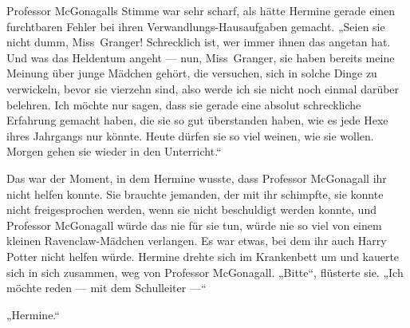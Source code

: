 Professor McGonagalls Stimme war sehr scharf, als hätte Hermine gerade einen furchtbaren Fehler bei ihren Verwandlungs-Hausaufgaben gemacht.
„Seien sie nicht dumm, Miss~Granger! Schrecklich ist, wer immer ihnen das angetan hat. Und was das Heldentum angeht — nun, Miss~Granger, sie haben bereits meine Meinung über junge Mädchen gehört, die versuchen, sich in solche Dinge zu verwickeln, bevor sie vierzehn sind, also werde ich sie nicht noch einmal darüber belehren. Ich möchte nur sagen, dass sie gerade eine absolut schreckliche Erfahrung gemacht haben, die sie so gut überstanden haben, wie es jede Hexe ihres Jahrgangs nur könnte. Heute dürfen sie so viel weinen, wie sie wollen. Morgen gehen sie wieder in den Unterricht.“

Das war der Moment, in dem Hermine wusste, dass Professor McGonagall ihr nicht helfen konnte. Sie brauchte jemanden, der mit ihr schimpfte, sie konnte nicht freigesprochen werden, wenn sie nicht beschuldigt werden konnte, und Professor McGonagall würde das nie für sie tun, würde nie so viel von einem kleinen Ravenclaw-Mädchen verlangen. Es war etwas, bei dem ihr auch Harry Potter nicht helfen würde. Hermine drehte sich im Krankenbett um und kauerte sich in sich zusammen, weg von Professor McGonagall.
„Bitte“, flüsterte sie.
„Ich möchte reden — mit dem Schulleiter —“

\later

„Hermine.“


